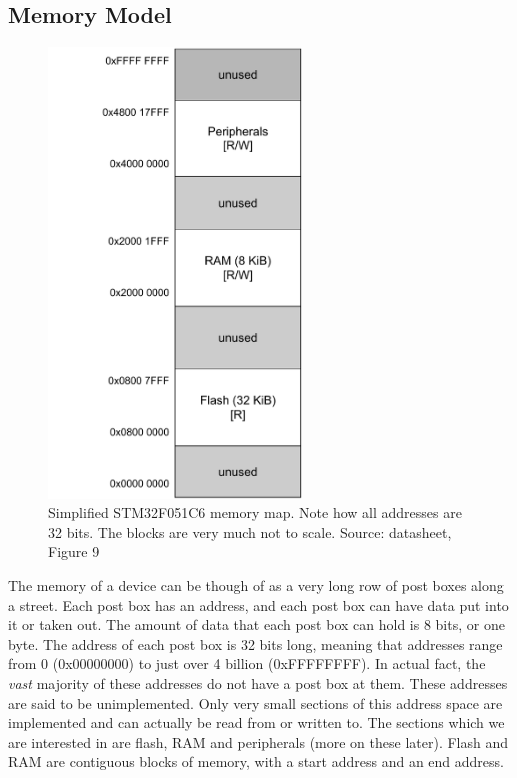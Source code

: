 \subsection{Memory Model}
\begin{figure}
  \centering
  \includegraphics[width=0.6\textwidth]{./week1/memory_model_v0.pdf}
  \caption{Simplified STM32F051C6 memory map. Note how all addresses are 32 bits. The blocks are very much not to scale. Source: datasheet, Figure 9}
\end{figure}
The memory of a device can be though of as a very long row of post boxes along a street. Each post box has an address, and each post box can have data put into it or taken out. The amount of data that each post box can hold is 8 bits, or one byte. 
The address of each post box is 32 bits long, meaning that addresses range from 0 (0x00000000) to just over 4 billion (0xFFFFFFFF). In actual fact, the \emph{vast} majority of these addresses do not have a post box at them. These addresses are said to be unimplemented. 
Only very small sections of this address space are implemented and can actually be read from or written to.
The sections which we are interested in are flash, RAM and peripherals (more on these later). Flash and RAM are contiguous blocks of memory, with a start address and an end address. \\

